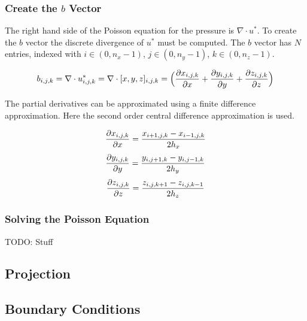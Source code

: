\subsubsection{Create the $b$ Vector}

The right hand side of the Poisson equation for the pressure is $\nabla \cdot u^*$.
To create the $b$ vector the discrete divergence of $u^*$ must be computed. The 
$b$ vector has $N$ entries, indexed with $i \in (0, n_x-1)$, $j \in (0, n_y-1)$,
$k \in (0, n_z-1)$.

$$ b_{i,j,k} = \nabla \cdot u^*_{i,j,k} = \nabla \cdot [x, y, z]_{i,j,k} = 
\Big( \frac{\partial x_{i,j,k}}{\partial x} + \frac{\partial y_{i,j,k}}{\partial y} + \frac{\partial z_{i,j,k}}{\partial z} \Big) $$

The partial derivatives can be approximated using a finite difference approximation. 
Here the second order central difference approximation is used.

$$ \frac{\partial x_{i,j,k}}{\partial x} = \frac{x_{i+1,j,k} - x_{i-1,j,k}}{2h_x} $$
$$ \frac{\partial y_{i,j,k}}{\partial y} = \frac{y_{i,j+1,k} - y_{i,j-1,k}}{2h_y} $$
$$ \frac{\partial z_{i,j,k}}{\partial z} = \frac{z_{i,j,k+1} - z_{i,j,k-1}}{2h_z} $$

\subsubsection{Solving the Poisson Equation}

TODO: Stuff

\subsection{Projection}



\subsection{Boundary Conditions}


